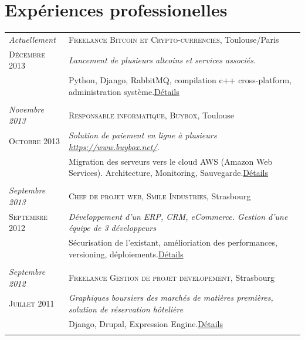 \documentclass[a4paper,10pt]{article}
\begin{document}
\section{Expériences professionelles}
\begin{tabular}{p{}|p{}}	

	\emph{Actuellement} & \textsc{Freelance Bitcoin et Crypto-currencies}, Toulouse/Paris \\\textsc{Décembre 2013}&\emph{Lancement de plusieurs altcoins et services associés.}\\&\footnotesize{Python, Django, RabbitMQ, compilation c++ cross-platform, administration système.\hyperlink{bitcoin}{\hfill \footnotesize Détails}}\\\multicolumn{2}{c}{} \\

	\emph{Novembre 2013} & \textsc{Responsable informatique, Buybox}, Toulouse \\\textsc{Octobre 2013}&\emph{Solution de paiement en ligne à plusieurs \href{https://www.buybox.net/}{https://www.buybox.net/}.}\\&\footnotesize{Migration des serveurs vers le cloud AWS (Amazon Web Services). Architecture, Monitoring, Sauvegarde.\hyperlink{buybox}{\hfill \footnotesize Détails}}\\\multicolumn{2}{c}{} \\
	\emph{Septembre 2013} & \textsc{Chef de projet web, Smile Industries}, Strasbourg \\\textsc{Septembre 2012}&\emph{Développement d'un ERP, CRM, eCommerce. Gestion d'une équipe de 3 développeurs}\\&\footnotesize{Sécurisation de l'existant, amélioriation des performances, versioning, déploiements.\hyperlink{axess}{\hfill \footnotesize Détails}}\\\multicolumn{2}{c}{} \\

	\emph{Septembre 2012} & \textsc{Freelance Gestion de projet developement}, Strasbourg \\\textsc{Juillet 2011}&\emph{Graphiques boursiers des marchés de matières premières, solution de réservation hôtelière}\\&\footnotesize{Django, Drupal, Expression Engine.\hyperlink{freelance}{\hfill \footnotesize Détails}}\\\multicolumn{2}{c}{} \\


\end{tabular}
\end{document}
